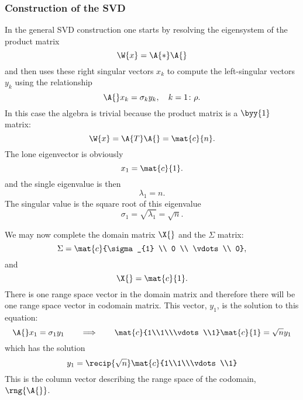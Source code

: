\subsubsection{Construction of the SVD}
In the general SVD construction one starts by resolving the eigensystem of the product matrix 
\begin{equation}
  \W{x} = \A{*}\A{}
\end{equation}
and then uses these right singular vectors $x_{k}$ to compute the left-singular vectors $y_{k}$ using the relationship
\begin{equation}
  \A{}x_{k} = \sigma_{k} y_{k}, \quad k=1\colon\rho.
\end{equation}
In this case the algebra is trivial because the product matrix is a $\byy{1}$ matrix:
\begin{equation}
  \W{x} = \A{T}\A{} = \mat{c}{n}.
\end{equation}
The lone eigenvector is obviously
\begin{equation}
  x_{1} = \mat{c}{1}.
\end{equation}
and the single eigenvalue is then
\begin{equation}
  \lambda_{1} = n.
\end{equation}
The singular value is the square root of this eigenvalue
\begin{equation}
  \sigma_{1} = \sqrt{\lambda_{1}} = \sqrt{n}.
\end{equation}

We may now complete the domain matrix $\X{}$ and the $\Sigma$ matrix:
\begin{equation}
  \Sigma = \mat{c}{\sigma_{1} \\ 0 \\ \vdots \\ 0},
\end{equation}
and 
\begin{equation}
  \X{} = \mat{c}{1}.
\end{equation}
There is one range space vector in the domain matrix and therefore there will be one range space vector in codomain matrix. This vector, $y_{1}$, is the solution to this equation:
\begin{equation}
  \A{}x_{1} = \sigma_{1}y_{1} \qquad \Longrightarrow \qquad \mat{c}{1\\1\\\vdots\\1}\mat{c}{1} = \sqrt{n} y_{1}
\end{equation}
which has the solution
\begin{equation}
  y_{1} = \recip{\sqrt{n}}\mat{c}{1\\1\\\vdots\\1}
\end{equation}
This is the column vector describing the range space of the codomain, $\rng{\A{}}$.


